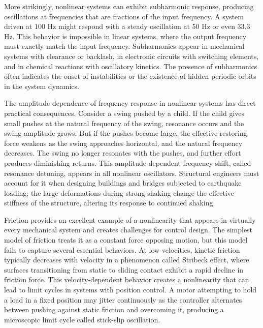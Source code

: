 More strikingly, nonlinear systems can exhibit subharmonic response, producing oscillations at frequencies that are fractions of the input frequency. A system driven at $100$ Hz might respond with a steady oscillation at $50$ Hz or even $33.3$ Hz. This behavior is impossible in linear systems, where the output frequency must exactly match the input frequency. Subharmonics appear in mechanical systems with clearance or backlash, in electronic circuits with switching elements, and in chemical reactions with oscillatory kinetics. The presence of subharmonics often indicates the onset of instabilities or the existence of hidden periodic orbits in the system dynamics.

The amplitude dependence of frequency response in nonlinear systems has direct practical consequences. Consider a swing pushed by a child. If the child gives small pushes at the natural frequency of the swing, resonance occurs and the swing amplitude grows. But if the pushes become large, the effective restoring force weakens as the swing approaches horizontal, and the natural frequency decreases. The swing no longer resonates with the pushes, and further effort produces diminishing returns. This amplitude-dependent frequency shift, called resonance detuning, appears in all nonlinear oscillators. Structural engineers must account for it when designing buildings and bridges subjected to earthquake loading; the large deformations during strong shaking change the effective stiffness of the structure, altering its response to continued shaking.

Friction provides an excellent example of a nonlinearity that appears in virtually every mechanical system and creates challenges for control design. The simplest model of friction treats it as a constant force opposing motion, but this model fails to capture several essential behaviors. At low velocities, kinetic friction typically decreases with velocity in a phenomenon called Stribeck effect, where surfaces transitioning from static to sliding contact exhibit a rapid decline in friction force. This velocity-dependent behavior creates a nonlinearity that can lead to limit cycles in systems with position control. A motor attempting to hold a load in a fixed position may jitter continuously as the controller alternates between pushing against static friction and overcoming it, producing a microscopic limit cycle called stick-slip oscillation.

